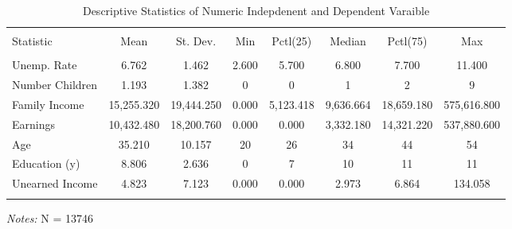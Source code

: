 \documentclass[a4paper]{article}
\begin{document}
\begin{table}[!htbp] 
\begin{adjustwidth}{-0cm}{-0cm}
\begin{threeparttable}
\small
\captionsetup{font=small, justification=raggedright,singlelinecheck=false}
  \caption{Descriptive Statistics of Numeric Indepdenent and Dependent Varaible} 
  \label{} 
\begin{tabular}{@{\extracolsep{5pt}}lccccccc} 
\\[-5.8ex]\hline 
\hline \\[-1.8ex] 
Statistic & \multicolumn{1}{c}{Mean} & \multicolumn{1}{c}{St. Dev.} & \multicolumn{1}{c}{Min} & \multicolumn{1}{c}{Pctl(25)} & \multicolumn{1}{c}{Median} & \multicolumn{1}{c}{Pctl(75)} & \multicolumn{1}{c}{Max} \\ 
\hline \\[-1.8ex] 
Unemp. Rate & 6.762 & 1.462 & 2.600 & 5.700 & 6.800 & 7.700 & 11.400 \\ 
Number Children & 1.193 & 1.382 & 0 & 0 & 1 & 2 & 9 \\ 
Family Income & 15,255.320 & 19,444.250 & 0.000 & 5,123.418 & 9,636.664 & 18,659.180 & 575,616.800 \\ 
Earnings & 10,432.480 & 18,200.760 & 0.000 & 0.000 & 3,332.180 & 14,321.220 & 537,880.600 \\ 
Age & 35.210 & 10.157 & 20 & 26 & 34 & 44 & 54 \\ 
Education (y) & 8.806 & 2.636 & 0 & 7 & 10 & 11 & 11 \\ 
Unearned Income & 4.823 & 7.123 & 0.000 & 0.000 & 2.973 & 6.864 & 134.058 \\ 
\hline \\[-3.6ex] 
\end{tabular} 
\begin{tablenotes}
      \small
      \item\textit{Notes:} N = 13746
    \end{tablenotes}
\end{threeparttable}
\end{adjustwidth}
\end{table}
\end{document}
